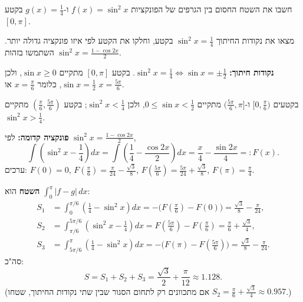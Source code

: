 
\begin{question}
חשבו את השטח החסום בין הגרפים של הפונקציות $f(x)=\sin^2x$ ו-$g(x)=\frac14$ בקטע $[0,\pi]$.
\end{question}

\begin{hint}
מצאו את נקודות החיתוך $\sin^2x=\frac14$ בקטע, וחלקו את הקטע לפי איזו פונקציה גדולה יותר. השתמשו בזהות $\sin^2x=\frac{1-\cos 2x}{2}$.
\end{hint}

\begin{solution}
\textbf{נקודות חיתוך:} $\sin^2x=\frac14\iff\sin x=\pm\frac12$. בקטע $[0,\pi]$ מתקיים $\sin x\ge 0$, ולכן $\sin x=\frac12$, כלומר $x=\frac{\pi}{6}$ או $x=\frac{5\pi}{6}$.

בקטעים $[0,\frac{\pi}{6})$ ו-$(\frac{5\pi}{6},\pi]$ מתקיים $0\le\sin x<\frac12$, ולכן $\sin^2x<\frac14$; בקטע $(\frac{\pi}{6},\frac{5\pi}{6})$ מתקיים $\sin^2x>\frac14$.

\textbf{פונקציה קדומה:} לפי $\sin^2x=\frac{1-\cos2x}{2}$,
\[ \int\left(\sin^2x-\frac14\right)dx=\int\left(\frac14-\frac{\cos 2x}{2}\right)dx=\frac{x}{4}-\frac{\sin 2x}{4}=:F(x). \]
ערכים: $F(0)=0$, $F(\frac{\pi}{6})=\frac{\pi}{24}-\frac{\sqrt3}{8}$, $F(\frac{5\pi}{6})=\frac{5\pi}{24}+\frac{\sqrt3}{8}$, $F(\pi)=\frac{\pi}{4}$.

\textbf{השטח} הוא $\int_0^\pi|f-g|\,dx$:
\begin{align*}
S_1&=\int_0^{\pi/6}\left(\tfrac14-\sin^2x\right)dx=-\big(F(\tfrac{\pi}{6})-F(0)\big)=\frac{\sqrt3}{8}-\frac{\pi}{24},\\
S_2&=\int_{\pi/6}^{5\pi/6}\left(\sin^2x-\tfrac14\right)dx=F(\tfrac{5\pi}{6})-F(\tfrac{\pi}{6})=\frac{\pi}{6}+\frac{\sqrt3}{4},\\
S_3&=\int_{5\pi/6}^{\pi}\left(\tfrac14-\sin^2x\right)dx=-\big(F(\pi)-F(\tfrac{5\pi}{6})\big)=\frac{\sqrt3}{8}-\frac{\pi}{24}.
\end{align*}
סה"כ:
\[ S=S_1+S_2+S_3=\frac{\sqrt3}{2}+\frac{\pi}{12}\approx 1.128. \]
(אם מתכוונים רק לתחום הסגור שבין שתי נקודות החיתוך, שטחו $S_2=\frac{\pi}{6}+\frac{\sqrt3}{4}\approx 0.957$.)
\end{solution}
